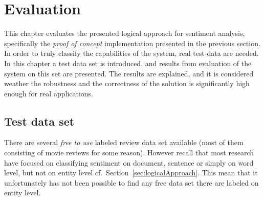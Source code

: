 
\chapter{Evaluation}
\label{chap:evaluation}

This chapter evaluates the presented logical approach for sentiment analysis, specifically the \emph{proof of concept} implementation presented in the previous section. In order to truly classify the capabilities of the system, real test-data are needed. In this chapter a test data set is introduced, and results from evaluation of the system on this set are presented. The results are explained, and it is considered weather the robustness and the correctness of the solution is significantly high enough for real applications.

\section{Test data set}
There are several \emph{free to use} labeled review data set available (most of them consisting of movie reviews for some reason). However recall that most research have focused on classifying sentiment on document, sentence or simply on word level, but not on entity level cf.\ Section~\vref{sec:logicalApproach}. This mean that it unfortunately has not been possible to find any free data set there are labeled on entity level. %

